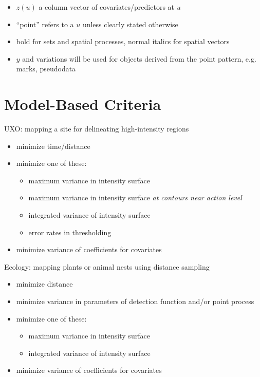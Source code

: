 \documentclass[12pt]{article}
\begin{document}
\begin{itemize}
\item \(z(u)\) a column vector of covariates/predictors at \(u\)

\item ``point'' refers to a \(u\) unless clearly stated otherwise

\item bold for sets and spatial processes, normal italics for spatial vectors

\item \(y\) and variations will be used for objects derived from the point pattern,
e.g. marks, pseudodata

\end{itemize}


\section{Model-Based Criteria}

UXO: mapping a site for delineating high-intensity regions
\begin{itemize}
\item minimize time/distance
\item minimize one of these:
\begin{itemize}
\item maximum variance in intensity surface
\item maximum variance in intensity surface \emph{at contours near action level}
\item integrated variance of intensity surface
\item error rates in thresholding
\end{itemize}
\item minimize variance of coefficients for covariates
\end{itemize}

Ecology: mapping plants or animal nests using distance sampling
\begin{itemize}
\item minimize distance
\item minimize variance in parameters of detection function and/or point process
\item minimize one of these:
\begin{itemize}
\item maximum variance in intensity surface
\item integrated variance of intensity surface
\end{itemize}
\item minimize variance of coefficients for covariates
\end{itemize}
\end{document}
